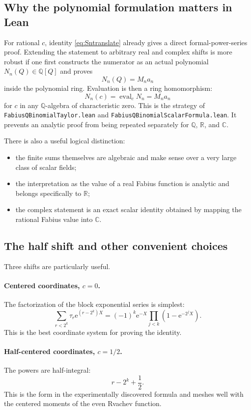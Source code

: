 \documentclass[11pt,oneside]{article}
\theoremstyle{definition}
\theoremstyle{remark}
\newcommand{\Q}{\mathbb Q}
\newcommand{\R}{\mathbb R}
\newcommand{\C}{\mathbb C}
\newcommand{\e}{\mathrm e}
\newcommand{\tm}{\tau}
\begin{document}
\subsection{Why the polynomial formulation matters in Lean}

For rational $c$, identity \eqref{eq:Sntranslate} already gives a direct
formal-power-series proof.  Extending the statement to arbitrary real and
complex shifts is more robust if one first constructs the numerator as an
actual polynomial $N_n(Q)\in\Q[Q]$ and proves
\[
 N_n(Q)=M_na_n
\]
inside the polynomial ring.  Evaluation is then a ring homomorphism:
\[
 N_n(c)=\operatorname{eval}_c N_n=M_na_n
\]
for $c$ in any $\Q$-algebra of characteristic zero.  This is the strategy of
\texttt{FabiusQBinomialTaylor.lean} and
\texttt{FabiusQBinomialScalarFormula.lean}.  It prevents an analytic proof
from being repeated separately for $\Q$, $\R$, and $\C$.

There is also a useful logical distinction:
\begin{itemize}[leftmargin=2em]
\item the finite sums themselves are algebraic and make sense over a very
large class of scalar fields;
\item the interpretation as the value of a real Fabius function is analytic
and belongs specifically to $\R$;
\item the complex statement is an exact scalar identity obtained by mapping
the rational Fabius value into $\C$.
\end{itemize}

\subsection{The half shift and other convenient choices}

Three shifts are particularly useful.

\paragraph{Centered coordinates, $c=0$.}
The factorization of the block exponential series is simplest:
\[
 \sum_{r<2^k}\tm_r\e^{(r-2^k)X}
 =(-1)^k\e^{-X}\prod_{j<k}(1-\e^{-2^jX}).
\]
This is the best coordinate system for proving the identity.

\paragraph{Half-centered coordinates, $c=1/2$.}
The powers are half-integral:
\[
 r-2^k+\frac12.
\]
This is the form in the experimentally discovered formula and meshes well
with the centered moments of the even Rvachev function.
\end{document}
